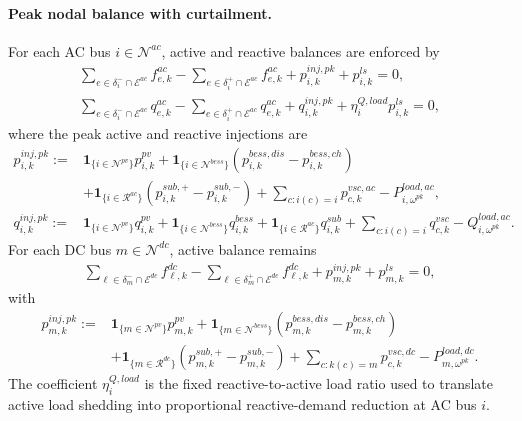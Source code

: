 \paragraph{Peak nodal balance with curtailment.}
For each AC bus \(i\in\mathcal{N}^{ac}\), active and reactive balances are enforced by
\begin{align}
\sum_{e\in\delta_i^{-}\cap\mathcal{E}^{ac}} f_{e,k}^{ac}
- \sum_{e\in\delta_i^{+}\cap\mathcal{E}^{ac}} f_{e,k}^{ac}
+ p_{i,k}^{inj,pk}
+ p_{i,k}^{ls}
= 0,
\label{eq:10b-cont-ac-balance}\\
\sum_{e\in\delta_i^{-}\cap\mathcal{E}^{ac}} q_{e,k}^{ac}
- \sum_{e\in\delta_i^{+}\cap\mathcal{E}^{ac}} q_{e,k}^{ac}
+ q_{i,k}^{inj,pk}
+ \eta_i^{Q,load} p_{i,k}^{ls}
= 0,
\label{eq:10b-cont-ac-reactive-balance}
\end{align}
where the peak active and reactive injections are
\begin{align}
p_{i,k}^{inj,pk} :=
&\mathbf{1}_{\{i\in\mathcal{N}^{pv}\}}p_{i,k}^{pv}
+ \mathbf{1}_{\{i\in\mathcal{N}^{bess}\}}\left(p_{i,k}^{bess,dis}-p_{i,k}^{bess,ch}\right) \\
&+ \mathbf{1}_{\{i\in\mathcal{R}^{ac}\}}\left(p_{i,k}^{sub,+}-p_{i,k}^{sub,-}\right)
+ \sum_{c:i(c)=i} p_{c,k}^{vsc,ac}
- P_{i,\omega^{pk}}^{load,ac},
\label{eq:10b-cont-ac-net-injection}\\
q_{i,k}^{inj,pk} :=
&\mathbf{1}_{\{i\in\mathcal{N}^{pv}\}} q_{i,k}^{pv}
+ \mathbf{1}_{\{i\in\mathcal{N}^{bess}\}} q_{i,k}^{bess}
+ \mathbf{1}_{\{i\in\mathcal{R}^{ac}\}} q_{i,k}^{sub}
+ \sum_{c:i(c)=i} q_{c,k}^{vsc}
- Q_{i,\omega^{pk}}^{load,ac}.
\label{eq:10b-cont-ac-reactive-net-injection}
\end{align}
For each DC bus \(m\in\mathcal{N}^{dc}\), active balance remains
\begin{align}
\sum_{\ell\in\delta_m^{-}\cap\mathcal{E}^{dc}} f_{\ell,k}^{dc}
- \sum_{\ell\in\delta_m^{+}\cap\mathcal{E}^{dc}} f_{\ell,k}^{dc}
+ p_{m,k}^{inj,pk}
+ p_{m,k}^{ls}
= 0,
\label{eq:10b-cont-dc-balance}
\end{align}
with
\begin{align}
p_{m,k}^{inj,pk} :=
&\mathbf{1}_{\{m\in\mathcal{N}^{pv}\}}p_{m,k}^{pv}
+ \mathbf{1}_{\{m\in\mathcal{N}^{bess}\}}\left(p_{m,k}^{bess,dis}-p_{m,k}^{bess,ch}\right) \\
&+ \mathbf{1}_{\{m\in\mathcal{R}^{dc}\}}\left(p_{m,k}^{sub,+}-p_{m,k}^{sub,-}\right)
+ \sum_{c:k(c)=m} p_{c,k}^{vsc,dc}
- P_{m,\omega^{pk}}^{load,dc}.
\label{eq:10b-cont-dc-net-injection}
\end{align}
The coefficient \(\eta_i^{Q,load}\) is the fixed reactive-to-active load ratio used to translate active load shedding into proportional reactive-demand reduction at AC bus \(i\).

